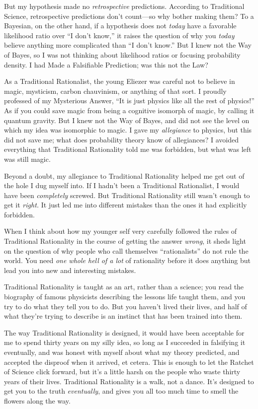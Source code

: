 {
 But my hypothesis made no \textit{retrospective} predictions.
According to Traditional Science, retrospective predictions
don't count---so why bother making them? To a Bayesian,
on the other hand, if a hypothesis does not \textit{today} have a
favorable likelihood ratio over ``I
don't know,'' it raises the question
of why you \textit{today} believe anything more complicated than
``I don't know.''
But I knew not the Way of Bayes, so I was not thinking about likelihood
ratios or focusing probability density. I had Made a Falsifiable
Prediction; was this not the Law?}

{
 As a Traditional Rationalist, the young Eliezer was careful not to
believe in magic, mysticism, carbon chauvinism, or anything of that
sort. I proudly professed of my Mysterious Answer,
``It is just physics like all the rest of
physics!'' As if you could save magic from being a
cognitive isomorph of magic, by calling it quantum gravity. But I knew
not the Way of Bayes, and did not see the level on which my idea was
isomorphic to magic. I gave my \textit{allegiance} to physics, but this
did not save me; what does probability theory know of allegiances? I
avoided everything that Traditional Rationality told me was forbidden,
but what was left was still magic.}

{
 Beyond a doubt, my allegiance to Traditional Rationality helped me
get out of the hole I dug myself into. If I hadn't been
a Traditional Rationalist, I would have been \textit{completely}
screwed. But Traditional Rationality still wasn't
enough to get it \textit{right.} It just led me into different mistakes
than the ones it had explicitly forbidden.}

{
 When I think about how my younger self very carefully followed the
rules of Traditional Rationality in the course of getting the answer
\textit{wrong}, it sheds light on the question of why people who call
themselves ``rationalists'' do not
rule the world. You need \textit{one whole hell of a lot} of
rationality before it does anything but lead you into new and
interesting mistakes.}

{
 Traditional Rationality is taught as an art, rather than a
science; you read the biography of famous physicists describing the
lessons life taught them, and you try to do what they tell you to do.
But you haven't lived their lives, and half of what
they're trying to describe is an instinct that has been
trained into them.}

{
 The way Traditional Rationality is designed, it would have been
acceptable for me to spend thirty years on my silly idea, so long as I
succeeded in falsifying it eventually, and was honest with myself about
what my theory predicted, and accepted the disproof when it arrived, et
cetera. This is enough to let the Ratchet of Science click forward, but
it's a little harsh on the people who waste thirty
years of their lives. Traditional Rationality is a walk, not a dance.
It's designed to get you to the truth
\textit{eventually}, and gives you all too much time to smell the
flowers along the way.}

